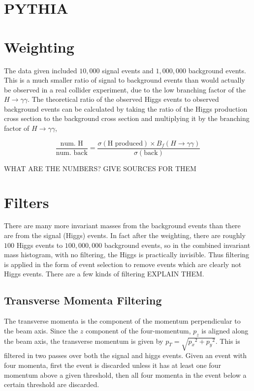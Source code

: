 \documentclass[11pt]{amsart}
\begin{document}
\begin{multicols}{2}
\section{PYTHIA}

\section{Weighting}

The data given included $10,000$ signal events and $1,000,000$ background events. This is a much smaller ratio of signal to background events than would actually be observed in a real collider experiment, due to the low branching factor of the $H \to \gamma\gamma$. The theoretical ratio of the observed Higgs events to observed background events can be calculated by taking the ratio of the Higgs production cross section to the background cross section and multiplying it by the branching factor of $H \to \gamma\gamma$,

\begin{equation}
  \label{eq:weighting}
  \frac{\text{num. H}}{\text{num. back}} = \frac{\sigma{\left(\text{H produced}\right)} \times B_f\left(H\to\gamma\gamma\right)}{\sigma{\left(\text{back}\right)}}
\end{equation}

WHAT ARE THE NUMBERS? GIVE SOURCES FOR THEM


\section{Filters}

There are many more invariant masses from the background events than there are from the signal (Higgs) events. In fact after the weighting, there are roughly $100$ Higgs events to $100,000,000$ background events, so in the combined invariant mass histogram, with no filtering, the Higgs is practically invisible. Thus filtering is applied in the form of event selection to remove events which are clearly not Higgs events. There are a few kinds of filtering EXPLAIN THEM.

\subsection{Transverse Momenta Filtering}

The transverse momenta is the component of the momentum perpendicular to the beam axis. Since the $z$ component of the four-momentum, $p_z$ is aligned along the beam axis, the transverse momentum is given by $p_T = \sqrt{{p_x}^2 + {p_y}^2}$. This is filtered in two passes over both the signal and higgs events. Given an event with four momenta, first the event is discarded unless it has at least one four momentum above a given threshold, then all four momenta in the event below a certain threshold are discarded.


\end{multicols}
\end{document}
